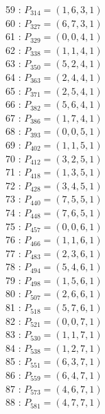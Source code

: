 \documentclass{article}
\begin{document}
{\begin{multicols}{3}
59 : $P_{314}=( 1, 6, 3, 1 )$\\
60 : $P_{327}=( 6, 7, 3, 1 )$\\
61 : $P_{329}=( 0, 0, 4, 1 )$\\
62 : $P_{338}=( 1, 1, 4, 1 )$\\
63 : $P_{350}=( 5, 2, 4, 1 )$\\
64 : $P_{363}=( 2, 4, 4, 1 )$\\
65 : $P_{371}=( 2, 5, 4, 1 )$\\
66 : $P_{382}=( 5, 6, 4, 1 )$\\
67 : $P_{386}=( 1, 7, 4, 1 )$\\
68 : $P_{393}=( 0, 0, 5, 1 )$\\
69 : $P_{402}=( 1, 1, 5, 1 )$\\
70 : $P_{412}=( 3, 2, 5, 1 )$\\
71 : $P_{418}=( 1, 3, 5, 1 )$\\
72 : $P_{428}=( 3, 4, 5, 1 )$\\
73 : $P_{440}=( 7, 5, 5, 1 )$\\
74 : $P_{448}=( 7, 6, 5, 1 )$\\
75 : $P_{457}=( 0, 0, 6, 1 )$\\
76 : $P_{466}=( 1, 1, 6, 1 )$\\
77 : $P_{483}=( 2, 3, 6, 1 )$\\
78 : $P_{494}=( 5, 4, 6, 1 )$\\
79 : $P_{498}=( 1, 5, 6, 1 )$\\
80 : $P_{507}=( 2, 6, 6, 1 )$\\
81 : $P_{518}=( 5, 7, 6, 1 )$\\
82 : $P_{521}=( 0, 0, 7, 1 )$\\
83 : $P_{530}=( 1, 1, 7, 1 )$\\
84 : $P_{538}=( 1, 2, 7, 1 )$\\
85 : $P_{551}=( 6, 3, 7, 1 )$\\
86 : $P_{559}=( 6, 4, 7, 1 )$\\
87 : $P_{573}=( 4, 6, 7, 1 )$\\
88 : $P_{581}=( 4, 7, 7, 1 )$\\
\end{multicols}


%


%


}%
\end{document}
